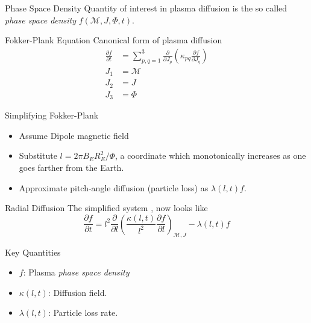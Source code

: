 \documentclass{beamer}
\begin{document}
\begin{frame}{Phase Space Density}
  Quantity of interest in plasma diffusion is the so called
  \emph{phase space density} $f(\mathcal{M}, J, \Phi, t)$.
\end{frame}

\begin{frame}{Fokker-Plank Equation}
  Canonical form of plasma diffusion \cite{Schulz1974} 
  \begin{align*}
    \frac{\partial{f}}{\partial{t}} &= \sum^{3}_{p,q = 1}
    \frac{\partial}{\partial{J_{p}}} \left( \kappa_{pq}
    \frac{\partial{f}}{\partial{J_{q}}} \right) \\
    J_1 &= \mathcal{M} \\
    J_2 &= J \\
    J_{3} &= \Phi
  \end{align*}
\end{frame}

\begin{frame}{Simplifying Fokker-Plank}

  \begin{itemize}
  \item Assume Dipole magnetic field
  \item Substitute $l = 2 \pi B_{E} R^{2}_{E}/\Phi$, a coordinate
    which monotonically increases as one goes farther from the Earth.
  \item Approximate pitch-angle diffusion (particle loss) as
    $\lambda(l, t) f$.
  \end{itemize}
\end{frame}

\begin{frame}{Radial Diffusion}
  The simplified system \cite{Walt1970}, now looks like
  \begin{equation*}
    \frac{\partial{f}}{\partial{t}} = l^2 \frac{\partial}{\partial{l}} \left( \frac{\kappa(l,
        t)}{l^{2}} \frac{\partial{f}}{\partial{l}}
    \right)_{\mathcal{M}, J} - \lambda(l,
    t) f
  \end{equation*}

  
\end{frame}

\begin{frame}{Key Quantities}
  \begin{itemize}
  \item {
      $f$: Plasma \emph{phase space density}
    \pause %
  }
  \item {   
      $\kappa(l, t)$: Diffusion field.
  }
  \item<3-> {
    $\lambda(l, t)$: Particle loss rate.
  }
  \end{itemize}
\end{frame}
\end{document}

